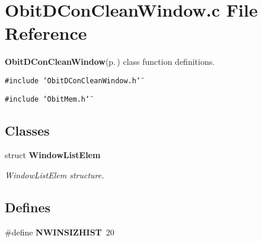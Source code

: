 \section{Obit\-DCon\-Clean\-Window.c File Reference}
\label{ObitDConCleanWindow_8c}
{\bf Obit\-DCon\-Clean\-Window}{\rm (p.\,\pageref{structObitDConCleanWindow})} class function definitions. 

{\tt \#include \char`\"{}Obit\-DCon\-Clean\-Window.h\char`\"{}}\par
{\tt \#include \char`\"{}Obit\-Mem.h\char`\"{}}\par
\subsection*{Classes}
\begin{CompactItemize}
\item 
struct {\bf Window\-List\-Elem}
\begin{CompactList}\small\item\em Window\-List\-Elem structure. \item\end{CompactList}\end{CompactItemize}
\subsection*{Defines}
\begin{CompactItemize}
\item 
\#define {\bf NWINSIZHIST}\ 20
\end{CompactItemize}
